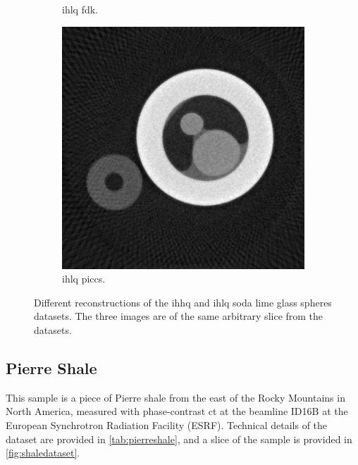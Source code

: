 \begin{figure}
\begin{subfigure}[t]{.31\textwidth}
      \caption{\gls{ihlq} \gls{fdk}.}
    \end{subfigure}
    \hfill  
    \begin{subfigure}[t]{.31\textwidth}
      \centering
      \includegraphics[width=\linewidth]{figures/kimrobertPICCS.png}
      \caption{\gls{ihlq} \gls{piccs}. }
    \end{subfigure}
    \caption[IHHQ and IHLQ soda lime glass spheres dataset]{Different reconstructions of the \gls{ihhq} and \gls{ihlq} soda lime glass spheres datasets. The three images are of the same arbitrary slice from the datasets. }
    \label{fig:kimrobertdatasets}
\end{figure}

\subsection{Pierre Shale}
\label{sec:method:datasets:shale}
This sample is a piece of Pierre shale from the east of the Rocky Mountains in North America, measured with phase-contrast \gls{ct} at the beamline ID16B at the European Synchrotron Radiation Facility (ESRF). Technical details of the dataset are provided in \cref{tab:pierreshale}, and a slice of the sample is provided in \cref{fig:shaledataset}. 

